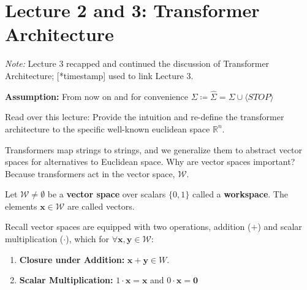 \documentclass[12pt, twoside]{article}
\begin{document}
\newpage


\thispagestyle{RemoveHeader}

\section*{Lecture 2 and 3: Transformer Architecture}

\textit{Note:} Lecture 3 recapped and continued the discussion of Transformer Architecture; [*timestamp] used to link Lecture 3.

\textbf{Assumption:} From now on and for convenience $\Sigma \coloneqq \hat{\Sigma}=\Sigma \cup \langle STOP\rangle$

\begin{exercise}
    Read over this lecture: Provide the intuition and re-define the transformer architecture to the specific well-known euclidean space $\mathbb{R}^n$.
\end{exercise}

Transformers map strings to strings, and we generalize them to abstract vector spaces for alternatives to Euclidean space. Why are vector spaces important? Because transformers act in the vector space, $\mathcal{W}$.

\begin{definition}[Workspace]
Let $\mathcal{W} \neq \emptyset$ be a \textbf{vector space} over scalars $\{0, 1\}$ called a \textbf{workspace}. The elements $\mathbf{x} \in \mathcal{W}$ are called vectors.

Recall vector spaces are equipped with two operations, addition ($+$) and scalar multiplication ($\cdot$), which for $\forall \mathbf{x}, \mathbf{y} \in \mathcal{W}$:
\begin{enumerate}
    \item \textbf{Closure under Addition:} $\mathbf{x} + \mathbf{y} \in W$.
    \item \textbf{Scalar Multiplication:} $1 \cdot \mathbf{x} = \mathbf{x}$ and $0 \cdot \mathbf{x} = \mathbf{0}$
\end{enumerate}
\end{definition}
\end{document}
